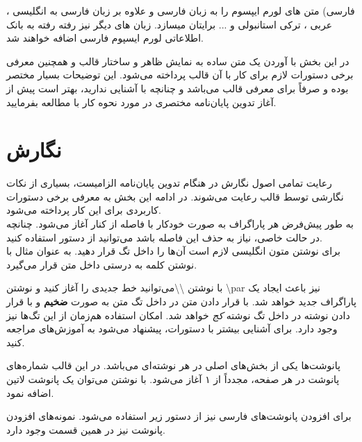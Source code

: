 فارسی) متن های لورم ایپسوم را به زبان فارسی و علاوه بر زبان فارسی به انگلیسی ، عربی ، ترکی استانبولی و ... برایتان میسازد. زبان های دیگر نیز رفته رفته به بانک اطلاعاتی لورم ایسپوم فارسی اضافه خواهند شد.  

در این بخش با آوردن یک متن ساده به نمایش ظاهر و ساختار قالب و همچنین معرفی برخی دستورات لازم برای کار با آن قالب پرداخته می‌شود. این توضیحات بسیار مختصر بوده و صرفاً برای معرفی قالب می‌باشد و چنانچه با  آشنایی ندارید، بهتر است پیش از آغاز تدوین پایان‌نامه مختصری در مورد نحوه کار با  مطالعه بفرمایید.
\section{نگارش}
رعایت تمامی اصول نگارش در هنگام تدوین پایان‌نامه الزامیست، بسیاری از نکات نگارشی توسط قالب رعایت می‌شوند. در ادامه این بخش به معرفی برخی دستورات کاربردی برای این کار پرداخته می‌شود.
\\
به طور پیش‌‌فرض هر پاراگراف به صورت خودکار با فاصله  از کنار آغاز می‌شود.  چنانچه در حالت خاصی، نیاز به حذف این فاصله باشد می‌توانید از دستور 
 \RTL{}\noindent
استفاده کنید.\\
برای نوشتن متون انگلیسی لازم است آن‌ها را داخل تگ
 قرار دهید. به عنوان مثال با نوشتن 
 کلمه  به درستی داخل متن قرار می‌گیرد.
 \par
 با نوشتن \textbackslash\textbackslash می‌توانید خط جدیدی را آغاز کنید و نوشتن \textbackslash par نیز باعث ایجاد یک پاراگراف جدید خواهد شد. با قرار دادن متن در داخل تگ  متن به صورت \textbf{ضخیم} و با قرار دادن نوشته در داخل تگ  نوشته \textit{کج} خواهد شد. امکان استفاده هم‌زمان از این تگ‌ها نیز وجود دارد. برای آشنایی بیشتر با دستورات، پیشنهاد می‌شود به آموزش‌های  مراجعه کنید.
 \par

 پانوشت‌‌ها یکی از بخش‌های اصلی در هر نوشته‌ای می‌باشد. در این قالب شماره‌های پانوشت در هر صفحه، مجدداً از ۱ آغاز می‌شود.  با نوشتن
 \RTL{} \noindent
  می‌توان یک پانوشت لاتین اضافه نمود.
 \par
برای افزودن پانوشت‌های فارسی نیز از دستور زیر استفاده می‌شود.
 \RTL{} \noindent
نمونه‌های افزودن پانوشت نیز در همین قسمت وجود دارد.






